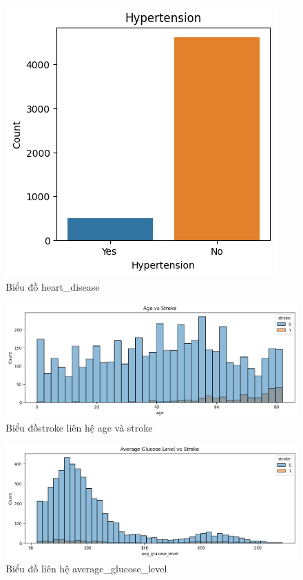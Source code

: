 \documentclass[11pt]{article}
\begin{document}
	 \begin{figure}[H]
	 	\centering
	 	\includegraphics[width=0.5\linewidth]{hypertensionChart}
	 	\caption{Biểu đồ heart\_disease}
	 	\label{fig:hypertensionchart}
	 \end{figure}
	 
	 \begin{figure}[H]
	 	\centering
	 	\includegraphics[width=1.0\linewidth]{ageAndStroke}
	 	\caption{Biểu đồstroke liên hệ age và stroke}
	 	\label{fig:ageandstroke}
	 \end{figure}
	 
	 \begin{figure}[H]
	 	\centering
	 	\includegraphics[width=1.0\linewidth]{glucoseAndStroke}
	 	\caption{Biểu đồ liên hệ average\_glucose\_level}
	 	\label{fig:glucoseandstroke}
	 \end{figure}
	 
\end{document}

